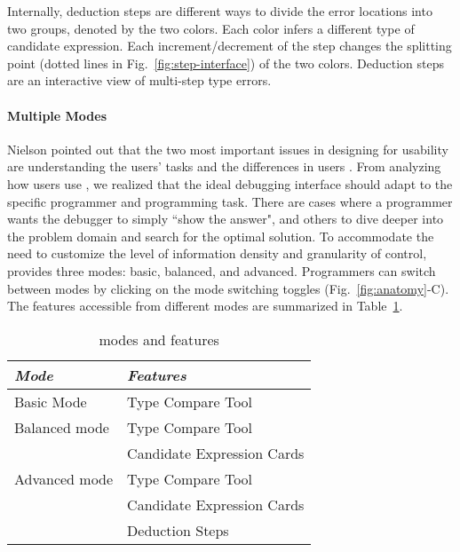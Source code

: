 Internally, deduction steps are different ways to divide the error locations into two groups, denoted by the two colors. Each color infers a different type of candidate expression. Each increment/decrement of the step changes the splitting point (dotted lines in Fig.~\ref{fig:step-interface}) of the two colors. Deduction steps are an interactive view of multi-step type errors.


\paragraph{Multiple Modes}

Nielson pointed out that the two most important issues in designing for usability are understanding the users' tasks and the differences in users \cite{Jakob_Nielsen1994-gd}. From analyzing how users use \chameleon{}, we realized that the ideal debugging interface should adapt to the specific programmer and programming task. There are cases where a programmer wants the debugger to simply ``show the answer", and others to dive deeper into the problem domain and search for the optimal solution. To accommodate the need to customize the level of information density and granularity of control, \chameleon{} provides three modes: basic, balanced, and advanced. Programmers can switch between modes by clicking on the mode switching toggles (Fig.~\ref{fig:anatomy}-C). The features accessible from different modes are summarized in Table~\ref{tab:chameleon-features}.%

\begin{table}
    \centering
\begin{scriptsize}
\begin{center}

    \begin{tabular}{ l l }
     \textit{Mode} & \textit{Features} \\ \hline
     Basic Mode  & Type Compare Tool \\ \hline
     Balanced mode & Type Compare Tool  \\
     & Candidate Expression Cards  \\  \hline
     Advanced mode & Type Compare Tool  \\
     & Candidate Expression Cards \\
     & Deduction Steps  \\
    \end{tabular}
    \end{center}
\end{scriptsize}
    \caption{\chameleon{} modes and features}
    \label {tab:chameleon-features}
\end{table}


